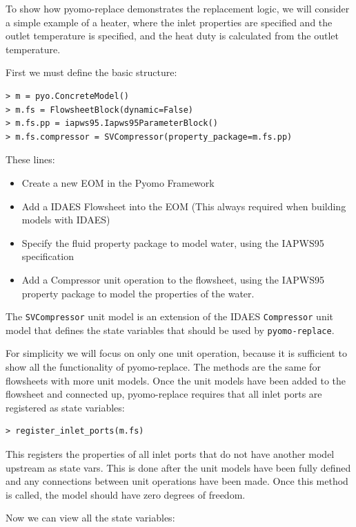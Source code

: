 To show how pyomo-replace demonstrates the replacement logic, we will
consider a simple example of a heater, where the inlet properties are
specified and the outlet temperature is specified, and the heat duty is
calculated from the outlet temperature.

First we must define the basic structure:

\begin{verbatim}
> m = pyo.ConcreteModel()
> m.fs = FlowsheetBlock(dynamic=False)
> m.fs.pp = iapws95.Iapws95ParameterBlock()
> m.fs.compressor = SVCompressor(property_package=m.fs.pp)
\end{verbatim}

These lines:

\begin{itemize}
\tightlist
\item
  Create a new EOM in the Pyomo Framework
\item
  Add a IDAES Flowsheet into the EOM (This always required when building
  models with IDAES)
\item
  Specify the fluid property package to model water, using the IAPWS95
  specification \citep{wagner2002iapws}
\item
  Add a Compressor unit operation to the flowsheet, using the IAPWS95
  property package to model the properties of the water.
\end{itemize}

The \texttt{SVCompressor} unit model is an extension of the IDAES
\texttt{Compressor} unit model that defines the state variables that
should be used by \texttt{pyomo-replace}.

For simplicity we will focus on only one unit operation, because it is
sufficient to show all the functionality of pyomo-replace. The methods
are the same for flowsheets with more unit models. Once the unit models
have been added to the flowsheet and connected up, pyomo-replace
requires that all inlet ports are registered as state variables:

\begin{verbatim}
> register_inlet_ports(m.fs)
\end{verbatim}

This registers the properties of all inlet ports that do not have
another model upstream as state vars. This is done after the unit models
have been fully defined and any connections between unit operations have
been made. Once this method is called, the model should have zero
degrees of freedom.

Now we can view all the state variables:

